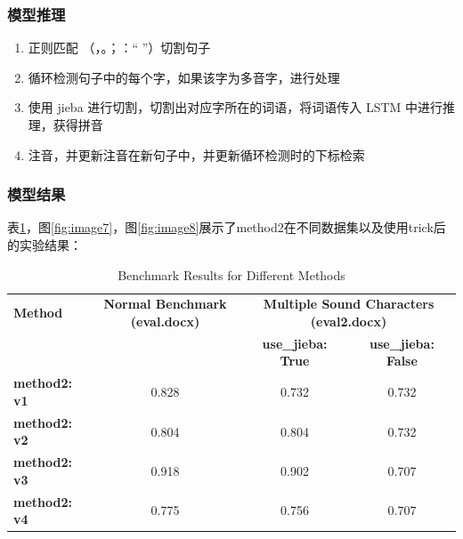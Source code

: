 \documentclass[12pt,hyperref,a4paper,UTF8]{ctexart}
\begin{document}
\subsubsection{模型推理}
\begin{enumerate}
  \item 正则匹配 （，。；：“ ”）切割句子
  \item 循环检测句子中的每个字，如果该字为多音字，进行处理
  \item 使用 jieba 进行切割，切割出对应字所在的词语，将词语传入 LSTM 中进行推理，获得拼音
  \item 注音，并更新注音在新句子中，并更新循环检测时的下标检索
\end{enumerate}
\subsubsection{模型结果}
表\ref{tab4}，图\ref{fig:image7}，图\ref{fig:image8}展示了method2在不同数据集以及使用trick后的实验结果：
\begin{table}[h!]
\centering
\caption{Benchmark Results for Different Methods}
\begin{tabular}{@{}lccc@{}}
\toprule
\label{tab4}
\textbf{Method} & \textbf{Normal Benchmark (eval.docx)} & \multicolumn{2}{c}{\textbf{Multiple Sound Characters (eval2.docx)}} \\ 
\cmidrule(r){3-4}
  & & \textbf{use\_jieba: True} & \textbf{use\_jieba: False} \\ 
\midrule
\textbf{method2: v1} & 0.828 & 0.732 & 0.732 \\ 
\textbf{method2: v2} & 0.804 & 0.804 & 0.732 \\ 
\textbf{method2: v3} & \cellcolor[HTML]{FFCCCC}0.918 & \cellcolor[HTML]{FFCCCC}0.902 & 0.707 \\ 
\textbf{method2: v4} & 0.775 & 0.756 & 0.707 \\ 
\bottomrule
\end{tabular}
\end{table}
\end{document}
